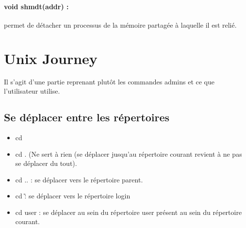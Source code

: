 \documentclass{article}[12pt]
\begin{document}
\paragraph{void shmdt(addr) : } permet de détacher un processus de la mémoire partagée à laquelle il est relié. 
\section{Unix Journey}
Il s'agit d'une partie reprenant plutôt les commandes admins et ce que l'utilisateur utilise.
\subsection{Se déplacer entre les répertoires}
\begin{itemize}
\item cd 
\item cd . (Ne sert à rien (se déplacer jusqu'au répertoire courant revient à ne pas se déplacer du tout). 
\item cd .. : se déplacer vers le répertoire parent. 
\item cd \~ : se déplacer vers le répertoire login
\item cd user : se déplacer au sein du répertoire user présent au sein du répertoire courant.
\end{itemize}
\end{document}
